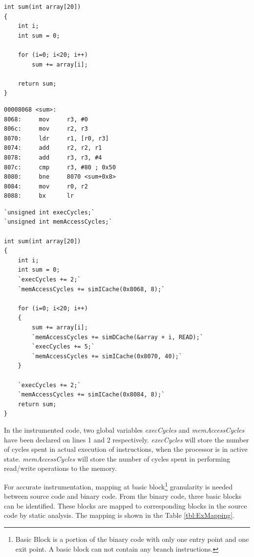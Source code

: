 \vspace*{10pt}
\begin{minipage}{0.5\textwidth}
\begin{lstlisting}[caption={Simple C Code},label={lst:sumCCode}]
int sum(int array[20])
{
	int i;
	int sum = 0;
	
	for (i=0; i<20; i++)
		sum += array[i];
	
	return sum;
}
\end{lstlisting}
\end{minipage}%
\begin{minipage}{0.5\textwidth}
\begin{lstlisting}[caption={Objdump Code},label={lst:sumObjCode}]
00008068 <sum>:
8068:     mov     r3, #0
806c:     mov     r2, r3
8070:     ldr     r1, [r0, r3]
8074:     add     r2, r2, r1
8078:     add     r3, r3, #4
807c:     cmp     r3, #80 ; 0x50
8080:     bne     8070 <sum+0x8>
8084:     mov     r0, r2
8088:     bx      lr
\end{lstlisting}
\end{minipage}
\vspace*{5pt}
\begin{lstlisting}[caption={Instrumented Code},label={lst:sumInstCode}]
`unsigned int execCycles;`
`unsigned int memAccessCycles;`

int sum(int array[20])
{
	int i;
	int sum = 0;
	`execCycles += 2;`
	`memAccessCycles += simICache(0x8068, 8);`
	
	for (i=0; i<20; i++)
	{
		sum += array[i];
		`memAccessCycles += simDCache(&array + i, READ);`
		`execCycles += 5;`
		`memAccessCycles += simICache(0x8070, 40);`
	}
	
	`execCycles += 2;`
	`memAccessCycles += simICache(0x8084, 8);`
	return sum;
}
\end{lstlisting}

In the instrumented code, two global variables \emph{execCycles} and \emph{memAccessCycles} have been declared on lines 1 and 2 respectively. \emph{execCycles} will store the number of cycles spent in actual execution of instructions, when the processor is in active state. \emph{memAccessCycles} will store the number of cycles spent in performing read/write operations to the memory.

For accurate instrumentation, mapping  at basic block\footnote{Basic Block is a portion of the binary code with only one entry point and one exit point. A basic block can not contain any branch instructions.} granularity is needed between source code and binary code. From the binary code, three basic blocks can be identified. These blocks are mapped to corresponding blocks in the source code by static analysis. The mapping is shown in the Table \ref{tbl:ExMapping}.

